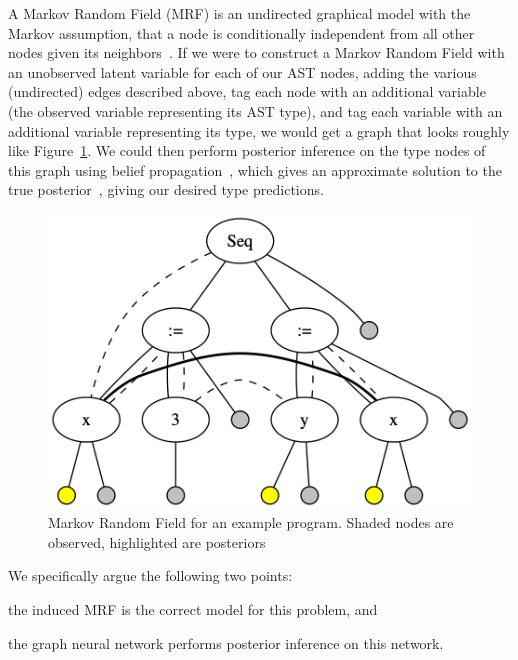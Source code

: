 A Markov Random Field (MRF) is an undirected graphical model with the Markov assumption, that a node is conditionally independent from all other nodes given its neighbors~\cite{kinderman80markov}.
If we were to construct a Markov Random Field with an unobserved latent variable for each of our AST nodes, adding the various (undirected) edges described above, tag each node with an additional variable (the observed variable representing its AST type), and tag each variable with an additional variable representing its type, we would get a graph that looks roughly like Figure~\ref{fig:mrf-graph}.
We could then perform posterior inference on the type nodes of this graph using belief propagation~\cite{pearl2009causality}, which gives an approximate solution to the true posterior~\cite{weiss2000correctness}, giving our desired type predictions.
\begin{figure}
	\centering
	\includegraphics[width=\linewidth]{img/mrf_graph}
	\caption{Markov Random Field for an example program. Shaded nodes are observed, highlighted are posteriors}
	\label{fig:mrf-graph}
\end{figure}

We specifically argue the following two points:
\begin{enumerate*}[label=(\roman*)]
	\item the induced MRF is the correct model for this problem, and
	\item the graph neural network performs posterior inference on this network.
\end{enumerate*}

